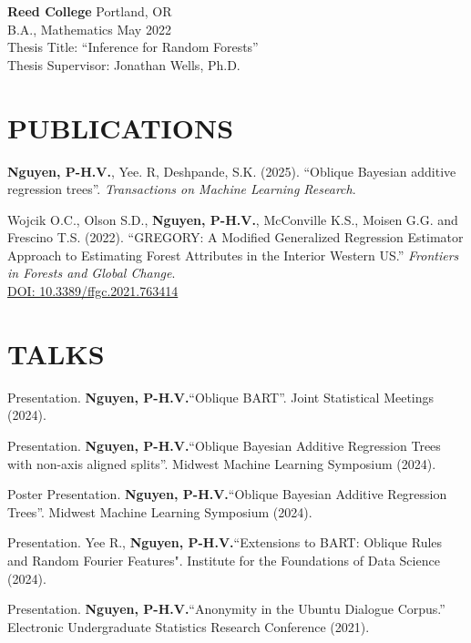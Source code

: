 \documentclass[margin]{res}
\def\pvn{\textbf{Nguyen, P-H.V.}}
\begin{document}
\begin{resume}
                {\bf Reed College} \hfill Portland, OR \\
                B.A., Mathematics \hfill May 2022 \\
                Thesis Title: ``Inference for Random Forests'' \\
                Thesis Supervisor: Jonathan Wells, Ph.D.
  
  


\section{PUBLICATIONS}

\pvn, Yee. R, Deshpande, S.K. (2025). ``Oblique Bayesian additive regression trees''. \textit{Transactions on Machine Learning Research}.

Wojcik O.C., Olson S.D., \pvn, McConville K.S., Moisen G.G. and Frescino T.S. (2022). ``GREGORY: A Modified Generalized Regression Estimator Approach to Estimating Forest Attributes in the Interior Western US.'' \textit{Frontiers in Forests and Global Change}. \\ \href{https://doi.org/10.3389/ffgc.2021.763414}{DOI: 10.3389/ffgc.2021.763414}



\section{TALKS}

Presentation. \pvn ``Oblique BART''. Joint Statistical Meetings (2024).

Presentation. \pvn ``Oblique Bayesian Additive Regression Trees with non-axis aligned splits''. Midwest Machine Learning Symposium (2024).

Poster Presentation. \pvn ``Oblique Bayesian Additive Regression Trees''. Midwest Machine Learning Symposium (2024).

Presentation. Yee R., \pvn  ``Extensions to BART: Oblique Rules and Random Fourier Features". Institute for the Foundations of Data Science (2024).

Presentation. \pvn ``Anonymity in the Ubuntu Dialogue Corpus.” Electronic Undergraduate Statistics Research Conference (2021).


\end{resume}
\end{document}

